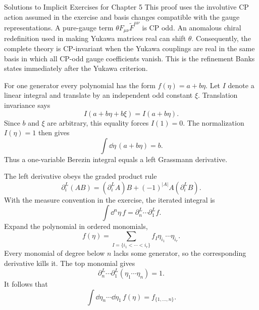 \begin{bankssolutions}{Solutions to Implicit Exercises for Chapter 5}
This proof uses the involutive CP action assumed in the exercise and basis
changes compatible with the gauge representations.  A pure-gauge term
$\theta F_{\mu\nu}\widetilde F^{\mu\nu}$ is CP odd.  An anomalous chiral
redefinition used in making Yukawa matrices real can shift $\theta$.
Consequently, the complete theory is CP-invariant when the Yukawa couplings
are real in the same basis in which all CP-odd gauge coefficients vanish.
This is the refinement Banks states immediately after the Yukawa criterion.

For one generator every polynomial has the form $f(\eta)=a+b\eta$.  Let $I$
denote a linear integral and translate by an independent odd constant $\xi$.
Translation invariance says
\begin{equation*}
  I(a+b\eta+b\xi)=I(a+b\eta).
\end{equation*}
Since $b$ and $\xi$ are arbitrary, this equality forces $I(1)=0$.  The
normalization $I(\eta)=1$ then gives
\begin{equation*}
  \int\dd\eta\,(a+b\eta)=b.
\end{equation*}
Thus a one-variable Berezin integral equals a left Grassmann derivative.

The left derivative obeys the graded product rule
\begin{equation*}
  \partial_i^L(AB)
  =(\partial_i^L A)B+(-1)^{|A|}A(\partial_i^L B).
\end{equation*}
With the measure convention in the exercise, the iterated integral is
\begin{equation*}
  \int\dd^n\eta\,f
  =\partial_n^L\cdots\partial_1^L f.
\end{equation*}
Expand the polynomial in ordered monomials,
\begin{equation*}
  f(\eta)=\sum_{I=\{i_1<\cdots<i_r\}}
  f_I\eta_{i_1}\cdots\eta_{i_r}.
\end{equation*}
Every monomial of degree below $n$ lacks some generator, so the corresponding
derivative kills it.  The top monomial gives
\begin{equation*}
  \partial_n^L\cdots\partial_1^L
  (\eta_1\cdots\eta_n)=1.
\end{equation*}
It follows that
\begin{equation*}
  \int\dd\eta_n\cdots\dd\eta_1\,f(\eta)
  =f_{\{1,\ldots,n\}}.
\end{equation*}


\end{bankssolutions}
